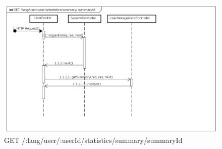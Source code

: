 \begin{itemize}
\label{Fallimento della procedura di visualizzazione del riepilogo di un particolare questionario svolto}
\begin{figure}[ht]
	\centering
	\includegraphics[scale=0.40]{UML/DiagrammiDiSequenza/Back-end/GET_LangUserUserIdStatisticsSummarySummaryIdFailure.png}
	\caption{GET /:lang/user/:userId/statistics/summary/summaryId}
\end{figure}
\FloatBarrier
\end{itemize}



